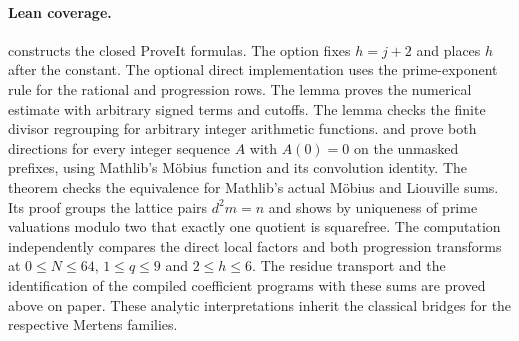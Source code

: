 \paragraph{Lean coverage.}
 constructs the closed ProveIt formulas. The option  fixes $h=j+2$ and  places $h$ after the constant. The optional direct implementation uses the prime-exponent rule for the rational and progression rows.
The lemma  proves the numerical estimate with arbitrary signed terms and cutoffs. The lemma  checks the finite divisor regrouping for arbitrary integer arithmetic functions.
 and  prove both directions for every integer sequence $A$ with $A(0)=0$ on the unmasked prefixes, using Mathlib's Möbius function and its convolution identity. The theorem  checks the equivalence for Mathlib's actual Möbius and Liouville sums. Its proof groups the lattice pairs $d^2m=n$ and shows by uniqueness of prime valuations modulo two that exactly one quotient is squarefree. The computation  independently compares the direct local factors and both progression transforms at $0\le N\le64$, $1\le q\le9$ and $2\le h\le6$. The residue transport and the identification of the compiled coefficient programs with these sums are proved above on paper. These analytic interpretations inherit the classical bridges for the respective Mertens families.
